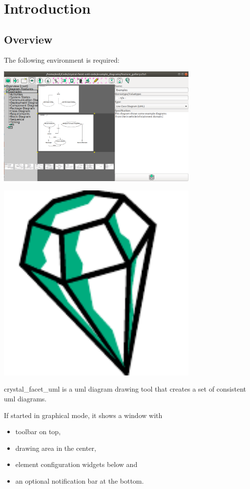 \chapter{Introduction}
\label{introduction}

\section{Overview}

The following environment is required:

\includegraphics[width=10cm]{screenshot_1.png}

\includegraphics[width=10cm]{../../gui/source/resources/crystal_facet_uml.pdf}


crystal\_facet\_uml is a uml diagram drawing tool
that creates a set of consistent uml diagrams.

If started in graphical mode, it shows a window with
\begin{itemize}
\item toolbar on top,
\item drawing area in the center,
\item element configuration widgets below and
\item an optional notification bar at the bottom.
\end{itemize}

